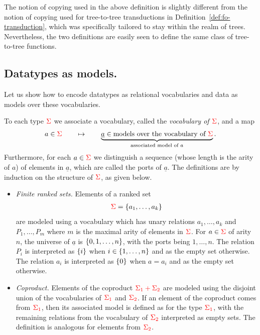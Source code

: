 The notion of copying used in the above definition is slightly different from the notion of copying used for tree-to-tree transductions in Definition~\ref{def:fo-transduction}, which was specifically tailored to stay within the realm of trees. Nevertheless, the two definitions are easily seen to define the same class of tree-to-tree functions.
 
\subsection{Datatypes  as models.}\label{sec:data-as-models}
Let us show how to encode datatypes as relational vocabularies and data as models over these vocabularies. 
\begin{definition} \label{def:type-model} To each type  ${\color{red}{\Sigma}}$ we associate a vocabulary, called the \emph{vocabulary of ${\color{red}{\Sigma}}$}, and a map 
    \begin{align*}
        a \in {\color{red}{\Sigma}} \qquad \mapsto \qquad \underbrace{\underline a \in \text{models over the  vocabulary of  ${\color{red}{\Sigma}}$}}_{\text{associated model of $a$}}.
    \end{align*}
    Furthermore, for each $a \in {\color{red}{\Sigma}}$ we  distinguish a  sequence (whose length is the arity of $a$) of elements in $\underline a$, which are called the ports of $\underline a$.   The definitions are by induction on the structure of ${\color{red}{\Sigma}}$, as given below.
    \begin{itemize}
        \item \emph{Finite ranked sets.} Elements of a ranked set   \begin{align*}
        {\color{red}{\Sigma}} =  \{a_1,\ldots,a_k\}
        \end{align*} are modeled  using a vocabulary which has unary relations $a_1,\ldots,a_k$ and $P_1,\ldots,P_m$ where $m$ is the maximal arity of elements in ${\color{red}{\Sigma}}$. 
        For $a \in {\color{red}{\Sigma}}$ of arity $n$, the  universe of $\underline a$ is $\{0,1,\ldots,n\}$, with the ports being $1,\ldots,n$. 
            The  relation $P_i$  is interpreted as $\{i\}$ when $i \in \{1,\ldots,n\}$ and as the empty set otherwise. The relation $a_i$ is interpreted as $\{0\}$ when $a = a_i$ and as the empty set otherwise. 
        \item \emph{Coproduct.}  Elements of the coproduct ${\color{red}{\Sigma_1 + \Sigma_2}}$ are modeled using the disjoint union of the vocabularies of ${\color{red}{\Sigma_1}}$ and ${\color{red}{\Sigma_2}}$. 
            If an element of the coproduct comes from ${\color{red}{\Sigma_1}}$, then its associated model is defined as for the type ${\color{red}{\Sigma_1}}$, with  the remaining relations from the vocabulary of   ${\color{red}{\Sigma_2}}$ interpreted   as empty sets. The definition is analogous for  elements from ${\color{red}{\Sigma_2}}$. 

\end{itemize}
\end{definition}
